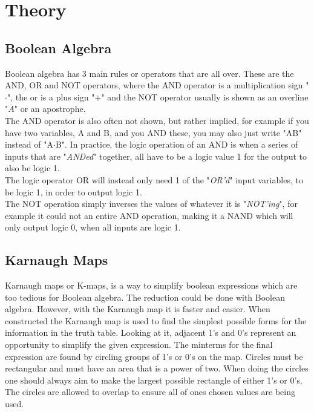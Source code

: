 \documentclass{article}
\begin{document}
\section*{Theory}
\subsection*{Boolean Algebra}
Boolean algebra has 3 main rules or operators that are all over. These are the AND, OR and NOT operators, 
where the AND operator is a multiplication sign "$\cdot$", the or is a plus sign "$+$" and the NOT operator usually 
is shown as an overline "$\si{\overline{A}}$" or an apostrophe.\\

\noindent The AND operator is also often not shown, but rather implied, for example if you have two variables, A and B, and you AND these,
you may also just write "AB" instead of "A$\cdot$B".
In practice, the logic operation of an AND is when a series of inputs that are "\textit{ANDed}" together, all have to be a 
logic value 1 for the output to also be logic 1.\\

\noindent The logic operator OR will instead only need 1 of the "\textit{OR'd}" input variables, to be logic 1, in order to output logic 1.\\

\noindent The NOT operation simply inverses the values of whatever it is "\textit{NOT'ing}", for example it could not an entire AND operation,
making it a NAND which will only output logic 0, when all inputs are logic 1.

\subsection*{Karnaugh Maps}
Karnaugh maps or K-maps, is a way to simplify boolean expressions which are too tedious for Boolean algebra. The reduction could be
done with Boolean algebra. However, with the Karnaugh map it is faster and easier.
When constructed the Karnaugh map is used to find the simplest possible forms for the information in the truth table.
Looking at it, adjacent 1's and 0's represent an opportunity to simplify the given expression. The minterms for the final expression
are found by circling groups of 1's or 0's on the map. Circles must be rectangular and must have an area that is a power of two. When doing
the circles one should always aim to make the largest possible rectangle of either 1's or 0's. The circles are allowed to overlap to ensure
all of ones chosen values are being used. \\[0.05cm]
\end{document}
